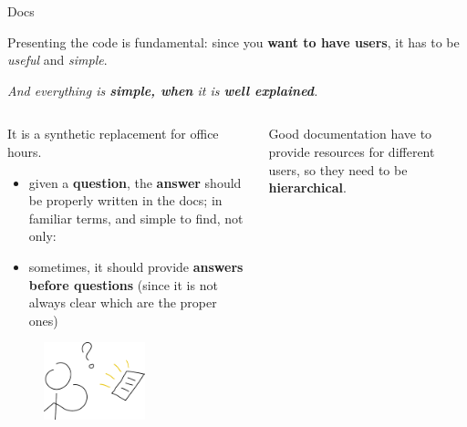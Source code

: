 \documentclass[9pt]{beamer}
\begin{document}
\begin{frame}{Docs}
    \begin{center}
        Presenting the code is fundamental: since you \textbf{want to have
        users}, it has to be \textit{useful} and \textit{simple}.

        \textit{And everything is \textbf{simple, when} it is
        \alert{\textbf{well explained}}.}
    \end{center}
    \vspace*{10pt}

    \begin{columns}
        \begin{column}{0.35\textwidth}
            It is a synthetic replacement for office hours.
            \vspace*{10pt}

            \begin{itemize}
                \item given a \textbf{question}, the \textbf{answer} should be
                  properly written in the docs; in familiar terms, and simple
                  to find, not only: 
                \item sometimes, it should provide \textbf{answers before
                  questions} (since it is not always clear which are the proper
                  ones)
            \end{itemize}

            \begin{figure}
                \centering
                \includegraphics[width=0.6\textwidth]{question-docs}
            \end{figure}
        \end{column}
        \begin{column}{0.35\textwidth}
            Good documentation have to provide resources for different users,
            so they need to be \textbf{hierarchical}.
            \vspace*{10pt}


\end{column}
\end{columns}
\end{frame}
\end{document}
